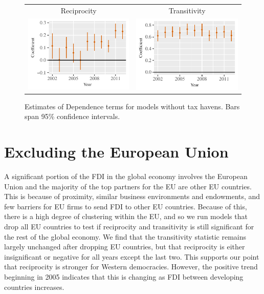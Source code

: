 \documentclass[reqno,onecolumn,letterpaper,12pt]{article}
\begin{document}
{\begin{figure}[!h]
\centering
\begin{tabular}{c@{\hskip 0cm}c}
Reciprocity & Transitivity \\
\includegraphics[height=.2\textheight, clip=true, trim=0cm 0cm 0cm .2cm]{draft_figures/rl_plots_haven/Mutuality.pdf}    &
\includegraphics[height=.2\textheight, clip=true, trim=0cm 0cm 0cm .2cm]{draft_figures/rl_plots_haven/Transitivity.pdf}
\end{tabular}
\caption{\label{fig:tax_havens_netterms} Estimates of Dependence terms for models without tax havens. Bars span 95\% confidence intervals. }
\end{figure}


\section{Excluding the European Union}\label{EUresults}

A significant portion of the FDI in the global economy involves the European Union and the majority of the top partners for the EU are other EU countries. This is because of proximity, similar business environments and endowments, and few barriers for EU firms to send FDI to other EU countries. Because of this, there is a high degree of clustering within the EU, and so we run models that drop all EU countries to test if reciprocity and transitivity is still significant for the rest of the global economy. We find that the transitivity statistic remains largely unchanged after dropping EU countries, but that reciprocity is either insignificant or negative for all years except the last two. This supports our point that reciprocity is stronger for Western democracies. However, the positive trend beginning in 2005 indicates that this is changing as FDI between developing countries increases.



}
\end{document}
